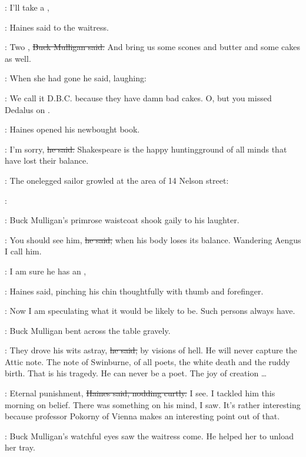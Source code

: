 \haines:
I'll take a ,

:
Haines said to the waitress.

\mulligan:
Two ,
\sout{Buck Mulligan said.}
And bring us some scones and butter
and some cakes as well.

:
When she had gone
he said, laughing:

\mulligan:
We call it D.B.C. because they have damn bad cakes.
O, but you missed
Dedalus on .

:
Haines opened his newbought book.%

\haines:
I'm sorry,
\sout{he said.}
Shakespeare is the happy huntingground of all minds
that have lost their balance.

\pagebreak[4]
\begin{interject}
    :
    The onelegged sailor growled at the area of 14 Nelson street:

    \smallskip
    \noindent\sailor:
\end{interject}

:
Buck Mulligan's primrose waistcoat shook gaily to his laughter.

\mulligan:
You should see him,
\sout{he said,}
when his body loses its balance.
Wandering Aengus I call him.

\haines:
I am sure he has an ,

:
Haines said,
pinching his chin thoughtfully with thumb and forefinger.

\haines:
Now I am speculating what it would be likely to be.
Such persons always have.

:
Buck Mulligan bent across the table gravely.

\mulligan:
They drove his wits astray,
\sout{he said,}
by visions of hell.
He will never capture the Attic note.
The note of Swinburne,
of all poets,
the white death and the ruddy birth.
That is his tragedy.
He can never be a poet.
The joy of creation \ldots

\haines:
Eternal punishment,
\sout{Haines said,
nodding curtly.}
I see.
I tackled him
this morning on belief.
There was something on his mind, I saw.
It's rather interesting
because professor Pokorny of Vienna
makes an interesting point out of that.

:
Buck Mulligan's watchful eyes saw the waitress come.
He helped her to unload her tray.

